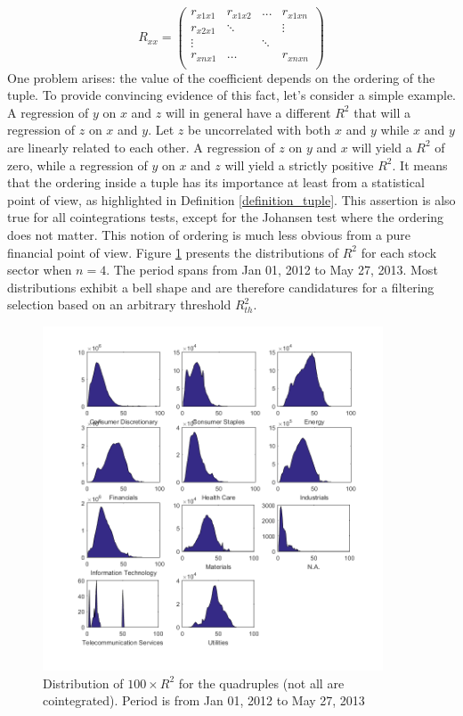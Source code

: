 \documentclass[11pt,a4,twosided,singlespacing,titlepagenumber=on]{scrreprt}
\numberwithin{equation}{chapter} %
\theoremstyle{remark}
\begin{document}
\begin{equation}
R_{xx} =\begin{pmatrix}
r_{x1x1}    & r_{x1x2} & ...  & r_{x1xn}  \\
r_{x2x1}    & \ddots &   & \vdots  \\
\vdots       &   & \ddots &   \\
r_{xnx1}    & \hdots &   & r_{xnxn} \\
\end{pmatrix} 
\end{equation}
One problem arises: the value of the coefficient depends on the ordering of the tuple. To provide convincing evidence of this fact, let's consider a simple example. A regression of $y$ on $x$ and $z$ will in general have a different $R^2$ that will a regression of $z$ on $x$ and $y$. Let $z$ be uncorrelated with both $x$ and $y$ while $x$ and $y$ are linearly related to each other. A regression of $z$ on $y$ and $x$ will yield a $R^2$ of zero, while a regression of $y$ on $x$ and $z$ will yield a strictly positive $R^2$. It means that the ordering inside a tuple has its importance at least from a statistical point of view, as highlighted in Definition \ref{definition_tuple}. This assertion is also true for all cointegrations tests, except for the Johansen test where the ordering does not matter. This notion of ordering is much less obvious from a pure financial point of view. Figure \ref{dist_100_r2_quad} presents the distributions of $R^2$ for each stock sector when $n=4$. The period spans from Jan 01, 2012 to May 27, 2013. Most distributions exhibit a bell shape and are therefore candidatures for a filtering selection based on an arbitrary threshold $R^2_{th}$.

\begin{figure}[H]
\centering
\includegraphics[width = 0.9\textwidth]{R2_ret_Quads_Jan_1_2012_Mar_27_2013}
\caption{Distribution of $100 \times R^2$ for the quadruples (not all are cointegrated). Period is from Jan 01, 2012 to May 27, 2013}
\label{dist_100_r2_quad}
\end{figure}
\end{document}
